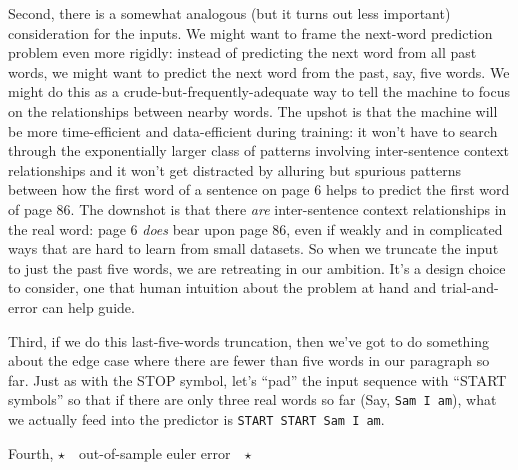 \documentclass[11pt, justified]{tufte-book}
\newcommand{\attnsam}[1]{{\red $\star$~~\textsf{#1}~~$\star$}}
\theoremstyle{definition}
\begin{document}
        Second, there is a somewhat analogous (but it turns out less important)
        consideration for the inputs.  We might want to frame the next-word
        prediction problem even more rigidly: instead of predicting the next
        word from all past words, we might want to predict the next word from
        the past, say, five words.  We might do this as a
        crude-but-frequently-adequate
        way to tell the machine to focus on the relationships between nearby
        words.  The upshot is that the machine will be more time-efficient and
        data-efficient during training: it won't have to search through the exponentially
        larger class of patterns involving inter-sentence context
        relationships and it won't get distracted by alluring but spurious
        patterns between how the first word of a sentence on page 6 helps to
        predict the first word of page 86.  The downshot is that there
        \emph{are} inter-sentence context relationships in the real word: page 6
        \emph{does} bear upon page 86, even if weakly and in complicated ways
        that are hard to learn from small datasets.  So when we truncate
        the input to just the past five words, we are retreating in our
        ambition.
        It's a design choice to consider, one that human intuition about the
        problem at hand and trial-and-error can help guide.

        Third, if we do this last-five-words truncation, then we've got to do
        something about the edge case where there are fewer than five words in
        our paragraph so far.  Just as with the STOP symbol, let's ``pad'' the
        input sequence with ``START symbols'' so that if there are only three
        real words so far (Say, \texttt{Sam I am}), what we actually feed into
        the predictor is \texttt{START START Sam I am}.

        Fourth, \attnsam{out-of-sample euler error}
\end{document}

